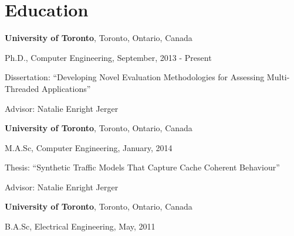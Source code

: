 \section{\sc Education}
{\bf University of Toronto}, Toronto, Ontario, Canada \\
\vspace*{-.1in}
\begin{list1}
\item[] Ph.D., Computer Engineering, September, 2013 - Present
\begin{list2}
\vspace*{.05in}
\item[] Dissertation:  ``Developing Novel Evaluation Methodologies for Assessing Multi-Threaded Applications'' 
\item[] Advisor:  Natalie Enright Jerger
\end{list2}
\end{list1}

{\bf University of Toronto}, Toronto, Ontario, Canada \\
\vspace*{-.1in}
\begin{list1}
\item[] M.A.Sc, Computer Engineering,  January, 2014
\begin{list2}
\vspace*{.05in}
\item[] Thesis:  ``Synthetic Traffic Models That Capture Cache Coherent Behaviour'' 
\item[] Advisor:  Natalie Enright Jerger
\end{list2}
\end{list1}

{\bf University of Toronto}, Toronto, Ontario, Canada \\
\vspace*{-.1in}
\begin{list1}
\item[] B.A.Sc, Electrical Engineering,  May, 2011
\end{list1}